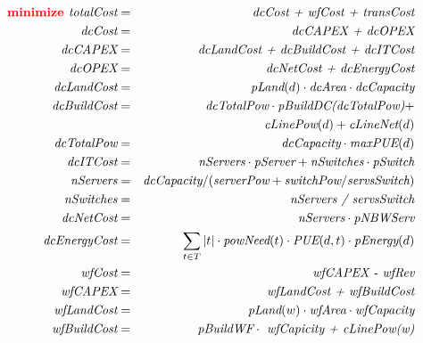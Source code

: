 \begin{figure}
\begin{scriptsize}
\begin{eqnarray}
 	\textbf{\red{minimize}   }   \textit{totalCost}&=&\textit{dcCost + wfCost + transCost} \\
	  \textit{dcCost}&=& \textit{dcCAPEX + dcOPEX} \\
         \textit{dcCAPEX}&=& \textit{dcLandCost + dcBuildCost + dcITCost} \\
        \textit{dcOPEX}&=& \textit{dcNetCost + dcEnergyCost} \\
         \textit{dcLandCost}&=& \textit{pLand}(d) \cdot  \textit{dcArea} \cdot  \textit{dcCapacity} \\
        \textit{dcBuildCost}&=& \textit{dcTotalPow} \cdot  \textit{pBuildDC(dcTotalPow)} + \nonumber\\
         &  & \textit{cLinePow}(d) +  \textit{cLineNet}(d) \\
         \textit{dcTotalPow} &=&  \textit{dcCapacity} \cdot  \textit{maxPUE}(d) \\
         \textit{dcITCost}&=& \textit{nServers} \cdot  \textit{pServer} +  \textit{nSwitches} \cdot
             \textit{pSwitch} \\
         \textit{nServers}&=& \textit{dcCapacity} / ( \textit{serverPow} %
          +  \textit{switchPow} /  \textit{servsSwitch})\\
         \textit{nSwitches}&=& \textit{nServers / servsSwitch}\\
         \textit{dcNetCost}&=& \textit{nServers} \cdot  \textit{pNBWServ} \\
         \textit{dcEnergyCost}&=&\sum_{t \in T} {|t| \cdot  \textit{powNeed}(t) \cdot  \textit{PUE}(d,t) \cdot  \textit{pEnergy}(d) } \\
 	 \textit{wfCost}&=& \textit{wfCAPEX - wfRev}  \\
         \textit{wfCAPEX}&=& \textit{wfLandCost + wfBuildCost} \\
         \textit{wfLandCost}&=& \textit{pLand}(w) \cdot  \textit{wfArea} \cdot  \textit{wfCapacity} \\
         \textit{wfBuildCost}&=& \textit{pBuildWF} \cdot \textit{ wfCapicity + cLinePow(w)} \\

\end{eqnarray}
\end{scriptsize}
\end{figure}
